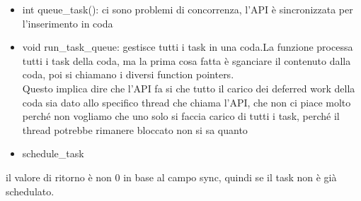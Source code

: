 \documentclass[12pt, oneside]{extbook}
\begin{document}
\begin{itemize}
\item \textsf{int queue\_task()}: ci sono problemi di concorrenza, l'API è sincronizzata per l'inserimento in coda
\item \textsf{void run\_task\_queue}: gestisce tutti i task in una coda.La funzione processa tutti i task della coda, ma la prima cosa fatta è sganciare il contenuto dalla coda, poi si chiamano i diversi function pointers.\\Questo implica dire che l'API fa si che tutto il carico dei deferred work della coda sia dato allo specifico thread che chiama l'API, che non ci piace molto perché non vogliamo che uno solo si faccia carico di tutti i task, perché il thread potrebbe rimanere bloccato non si sa quanto
\item \textsf{schedule\_task}
\end{itemize}
il valore di ritorno è non 0 in base al campo sync, quindi se il task non è già schedulato.
\end{document}
